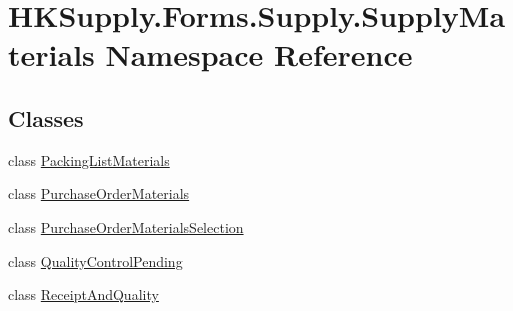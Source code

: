 \hypertarget{namespace_h_k_supply_1_1_forms_1_1_supply_1_1_supply_materials}{}\section{H\+K\+Supply.\+Forms.\+Supply.\+Supply\+Materials Namespace Reference}
\label{namespace_h_k_supply_1_1_forms_1_1_supply_1_1_supply_materials}
\subsection*{Classes}
\begin{DoxyCompactItemize}
\item 
class \mbox{\hyperlink{class_h_k_supply_1_1_forms_1_1_supply_1_1_supply_materials_1_1_packing_list_materials}{Packing\+List\+Materials}}
\item 
class \mbox{\hyperlink{class_h_k_supply_1_1_forms_1_1_supply_1_1_supply_materials_1_1_purchase_order_materials}{Purchase\+Order\+Materials}}
\item 
class \mbox{\hyperlink{class_h_k_supply_1_1_forms_1_1_supply_1_1_supply_materials_1_1_purchase_order_materials_selection}{Purchase\+Order\+Materials\+Selection}}
\item 
class \mbox{\hyperlink{class_h_k_supply_1_1_forms_1_1_supply_1_1_supply_materials_1_1_quality_control_pending}{Quality\+Control\+Pending}}
\item 
class \mbox{\hyperlink{class_h_k_supply_1_1_forms_1_1_supply_1_1_supply_materials_1_1_receipt_and_quality}{Receipt\+And\+Quality}}
\end{DoxyCompactItemize}
